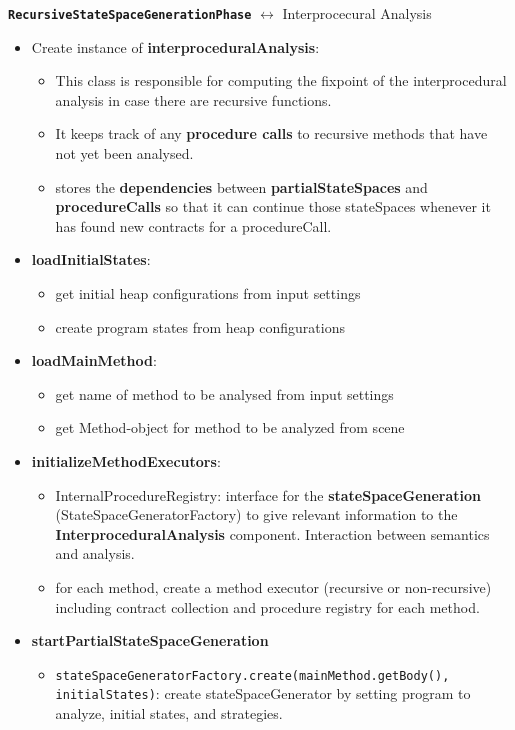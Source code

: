 \documentclass[a4paper,12pt]{article}
\begin{document}
 \textbf{\texttt{RecursiveStateSpaceGenerationPhase}} $\leftrightarrow$ Interprocecural Analysis

\begin{itemize}
	\item Create instance of \textbf{interproceduralAnalysis}: 
	\begin{itemize}
		\item This class is responsible for computing the fixpoint of the interprocedural analysis in case there are recursive functions. 
		\item It keeps track of any \textbf{procedure calls} to recursive methods that have not yet been analysed.
		\item stores the \textbf{dependencies} between \textbf{partialStateSpaces} and \textbf{procedureCalls} so that it can continue those stateSpaces whenever it has found new contracts for a procedureCall.
	\end{itemize}
	\item \textbf{loadInitialStates}: 
	\begin{itemize}
		\item get initial heap configurations from input settings
		\item create program states from heap configurations
	\end{itemize}
	\item \textbf{loadMainMethod}:
	\begin{itemize}
		\item get name of method to be analysed from input settings
		\item get Method-object for method to be analyzed from scene
	\end{itemize}
	\item \textbf{initializeMethodExecutors}: 
	\begin{itemize}
		\item InternalProcedureRegistry:
		interface for the \textbf{stateSpaceGeneration} (StateSpaceGeneratorFactory) to give relevant information to the \textbf{InterproceduralAnalysis} component. Interaction between semantics and analysis.
		\item for each method, create a method executor (recursive or non-recursive) including contract collection and procedure registry for each method.
	\end{itemize}
	\item \textbf{startPartialStateSpaceGeneration}
	\begin{itemize}
		\item \texttt{stateSpaceGeneratorFactory.create(mainMethod.getBody(), initialStates)}: create stateSpaceGenerator by setting program to analyze, initial states, and strategies.

\end{itemize}
\end{itemize}
\end{document}
